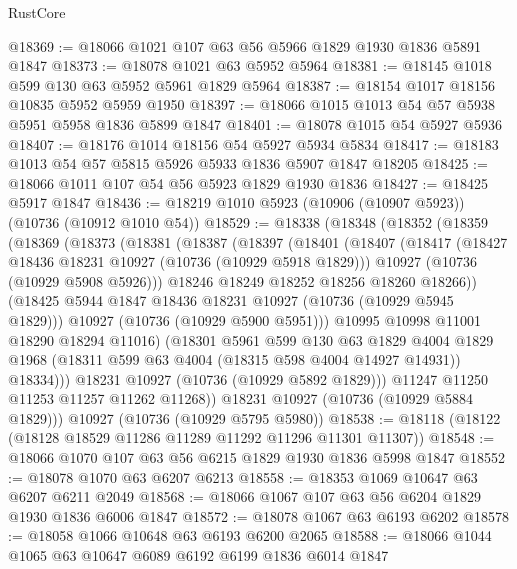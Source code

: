 \begin{lexlean}{RustCore}
\begin{coremodule}
@18369 := @18066 @1021 @107 @63 @56 @5966 @1829 @1930 @1836 @5891 @1847
@18373 := @18078 @1021 @63 @5952 @5964
@18381 := @18145 @1018 @599 @130 @63 @5952 @5961 @1829 @5964
@18387 := @18154 @1017 @18156 @10835 @5952 @5959 @1950
@18397 := @18066 @1015 @1013 @54 @57 @5938 @5951 @5958 @1836 @5899 @1847
@18401 := @18078 @1015 @54 @5927 @5936
@18407 := @18176 @1014 @18156 @54 @5927 @5934 @5834
@18417 := @18183 @1013 @54 @57 @5815 @5926 @5933 @1836 @5907 @1847 @18205
@18425 := @18066 @1011 @107 @54 @56 @5923 @1829 @1930 @1836
@18427 := @18425 @5917 @1847
@18436 := @18219 @1010 @5923 (@10906 (@10907 @5923)) (@10736 (@10912 @1010 @54))
@18529 := @18338
    (@18348
      (@18352
        (@18359
          (@18369
            (@18373
              (@18381
                (@18387
                  (@18397
                    (@18401
                      (@18407
                        (@18417
                          (@18427 @18436 @18231 @10927 (@10736 (@10929 @5918 @1829)))
                          @10927
                          (@10736 (@10929 @5908 @5926)))
                        @18246
                        @18249
                        @18252
                        @18256
                        @18260
                        @18266))
                    (@18425 @5944 @1847 @18436 @18231 @10927 (@10736 (@10929 @5945 @1829)))
                    @10927
                    (@10736 (@10929 @5900 @5951)))
                  @10995
                  @10998
                  @11001
                  @18290
                  @18294
                  @11016)
                (@18301
                  @5961
                  @599
                  @130
                  @63
                  @1829
                  @4004
                  @1829
                  @1968
                  (@18311 @599 @63 @4004 (@18315 @598 @4004 @14927 @14931))
                  @18334)))
            @18231
            @10927
            (@10736 (@10929 @5892 @1829)))
          @11247
          @11250
          @11253
          @11257
          @11262
          @11268))
      @18231
      @10927
      (@10736 (@10929 @5884 @1829)))
    @10927
    (@10736 (@10929 @5795 @5980))
@18538 := @18118 (@18122 (@18128 @18529 @11286 @11289 @11292 @11296 @11301 @11307))
@18548 := @18066 @1070 @107 @63 @56 @6215 @1829 @1930 @1836 @5998 @1847
@18552 := @18078 @1070 @63 @6207 @6213
@18558 := @18353 @1069 @10647 @63 @6207 @6211 @2049
@18568 := @18066 @1067 @107 @63 @56 @6204 @1829 @1930 @1836 @6006 @1847
@18572 := @18078 @1067 @63 @6193 @6202
@18578 := @18058 @1066 @10648 @63 @6193 @6200 @2065
@18588 := @18066 @1044 @1065 @63 @10647 @6089 @6192 @6199 @1836 @6014 @1847

\end{coremodule}
\end{lexlean}
